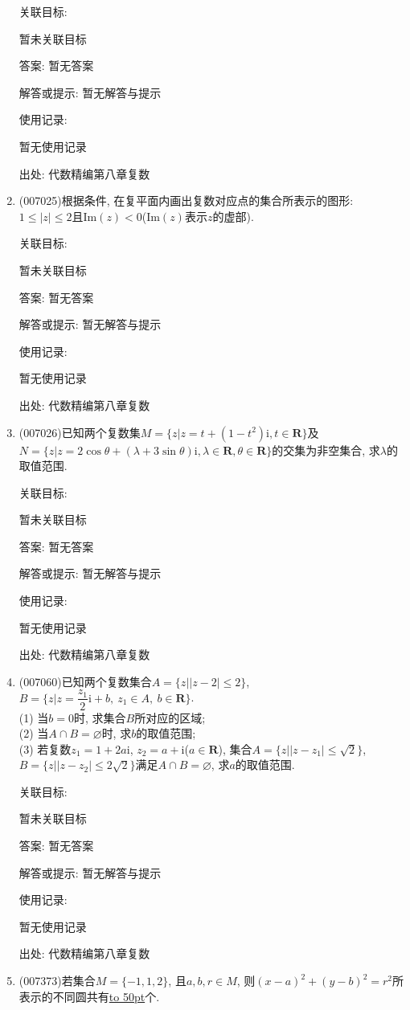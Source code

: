 \documentclass[10pt,a4paper]{article}
\newcommand{\blank}[1]{\underline{\hbox to #1pt{}}}
\begin{document}
\begin{enumerate}[1.]
关联目标:

暂未关联目标

答案: 暂无答案

解答或提示: 暂无解答与提示

使用记录:

暂无使用记录


出处: 代数精编第八章复数
\item { (007025)}根据条件, 在复平面内画出复数对应点的集合所表示的图形: $1\le|z|\le 2$且$\mathrm{Im}(z)<0$($\mathrm{Im}(z)$表示$z$的虚部).


关联目标:

暂未关联目标

答案: 暂无答案

解答或提示: 暂无解答与提示

使用记录:

暂无使用记录


出处: 代数精编第八章复数
\item { (007026)}已知两个复数集$M=\{z|z=t+(1-t^2)\mathrm{i}, t\in \mathbf{R}\}$及$N=\{z|z=2\cos \theta +(\lambda +3\sin \theta)\mathrm{i},\lambda \in \mathbf{R},\theta \in \mathbf{R}\}$的交集为非空集合, 求$\lambda$的取值范围.


关联目标:

暂未关联目标

答案: 暂无答案

解答或提示: 暂无解答与提示

使用记录:

暂无使用记录


出处: 代数精编第八章复数
\item { (007060)}已知两个复数集合$A=\{z||z-2|\le 2\}$, $B=\{z|z=\dfrac{z_1}2\mathrm{i}+b, \ z_1\in A, \ b\in \mathbf{R}\}$.\\
(1) 当$b=0$时, 求集合$B$所对应的区域;\\
(2) 当$A\cap B=\varnothing$时, 求$b$的取值范围;\\
(3) 若复数$z_1=1+2a\mathrm{i}$, $z_2=a+\mathrm{i}$($a\in \mathbf{R}$), 集合$A=\{z||z-z_1|\le \sqrt 2\}$, $B=\{z||z-z_2|\le 2\sqrt 2\}$满足$A\cap B=\varnothing$, 求$a$的取值范围.


关联目标:

暂未关联目标

答案: 暂无答案

解答或提示: 暂无解答与提示

使用记录:

暂无使用记录


出处: 代数精编第八章复数
\item { (007373)}若集合$M=\{-1,1,2\}$, 且$a,b,r\in M$, 则$(x-a)^2+(y-b)^2=r^2$所表示的不同圆共有\blank{50}个.



\end{enumerate}
\end{document}
